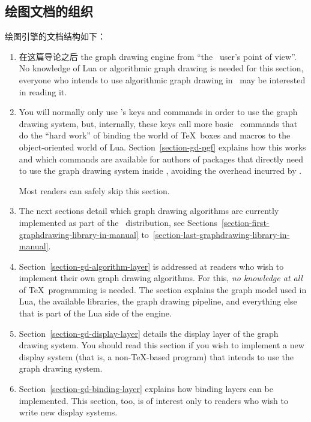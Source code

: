 \subsection{绘图文档的组织}

绘图引擎的文档结构如下：
\begin{enumerate}
\item 在这篇导论之后
  the graph drawing engine from ``the \tikzname\ user's point of
  view''. No knowledge of Lua or algorithmic graph drawing is needed
  for this section, everyone who intends to use algorithmic graph
  drawing in \tikzname\ may be interested in reading it.
\item You will normally only use \tikzname's keys and
  commands in order to use the graph drawing system, but, internally,
  these keys call more basic \pgfname\ commands that do the ``hard
  work'' of binding the world of \TeX\ boxes and macros to the
  object-oriented world of Lua. Section~\ref{section-gd-pgf} explains
  how this works and which commands are available for authors of
  packages that directly need to use the graph drawing system inside
  \pgfname, avoiding the overhead incurred by \tikzname.

  Most readers can safely skip this section.
\item The next sections detail which graph drawing algorithms are
  currently implemented as part of the \tikzname\ distribution, see
  Sections~\ref{section-first-graphdrawing-library-in-manual}
  to~\ref{section-last-graphdrawing-library-in-manual}.
\item
  Section~\ref{section-gd-algorithm-layer} is addressed at readers
  who wish to implement their own graph drawing
  algorithms. For this, \emph{no knowledge at all} of \TeX\
  programming is needed. The section explains the graph model used in
  Lua, the available libraries, the graph drawing pipeline, and everything
  else that is part of the Lua side of the engine.
\item
  Section~\ref{section-gd-display-layer} details the
  display layer of the graph drawing system.  You should read this 
  section if you wish to implement a new display system (that is, a
  non-\TeX-based program) that intends to use the graph drawing system.
\item
  Section~\ref{section-gd-binding-layer} explains how binding layers
  can be implemented. This section, too, is of interest only to
  readers who wish to write new display systems. 
\end{enumerate}




